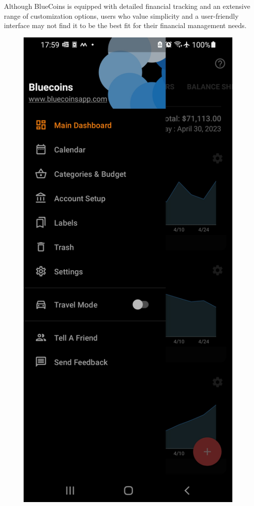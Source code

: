 \hspace{\parindent}Although BlueCoins is equipped with detailed financial tracking and an extensive range of customization options, users who value simplicity and a user-friendly interface may not find it to be the best fit for their financial management needs.
\begin{figure}[htbp]
  \centering
  \begin{minipage}[b]{0.24\textwidth}
    \includegraphics[width=\textwidth]{Screen Shots/BlueCoins/D_MainMenu.jpg}

\end{minipage}
\end{figure}
